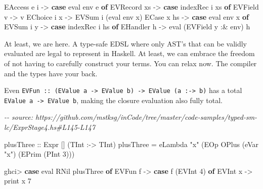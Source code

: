 \documentclass[]{article}
\newenvironment{Shaded}{}{}
\newcommand{\CommentTok}[1]{\textcolor[rgb]{0.38,0.63,0.69}{\textit{#1}}}
\newcommand{\DataTypeTok}[1]{\textcolor[rgb]{0.56,0.13,0.00}{#1}}
\newcommand{\DecValTok}[1]{\textcolor[rgb]{0.25,0.63,0.44}{#1}}
\newcommand{\FunctionTok}[1]{\textcolor[rgb]{0.02,0.16,0.49}{#1}}
\newcommand{\KeywordTok}[1]{\textcolor[rgb]{0.00,0.44,0.13}{\textbf{#1}}}
\newcommand{\NormalTok}[1]{#1}
\newcommand{\OperatorTok}[1]{\textcolor[rgb]{0.40,0.40,0.40}{#1}}
\newcommand{\OtherTok}[1]{\textcolor[rgb]{0.00,0.44,0.13}{#1}}
\newcommand{\StringTok}[1]{\textcolor[rgb]{0.25,0.44,0.63}{#1}}
\begin{document}
\begin{Shaded}
\begin{Highlighting}[]
  \DataTypeTok{EAccess}\NormalTok{ e i }\OtherTok{{-}\textgreater{}} \KeywordTok{case}\NormalTok{ eval env e }\KeywordTok{of}
    \DataTypeTok{EVRecord}\NormalTok{ xs }\OtherTok{{-}\textgreater{}} \KeywordTok{case}\NormalTok{ indexRec i xs }\KeywordTok{of}
      \DataTypeTok{EVField}\NormalTok{ v }\OtherTok{{-}\textgreater{}}\NormalTok{ v}
  \DataTypeTok{EChoice}\NormalTok{ i x }\OtherTok{{-}\textgreater{}} \DataTypeTok{EVSum}\NormalTok{ i (eval env x)}
  \DataTypeTok{ECase}\NormalTok{ x hs }\OtherTok{{-}\textgreater{}} \KeywordTok{case}\NormalTok{ eval env x }\KeywordTok{of}
    \DataTypeTok{EVSum}\NormalTok{ i y }\OtherTok{{-}\textgreater{}} \KeywordTok{case}\NormalTok{ indexRec i hs }\KeywordTok{of}
      \DataTypeTok{EHandler}\NormalTok{ h }\OtherTok{{-}\textgreater{}}\NormalTok{ eval (}\DataTypeTok{EVField}\NormalTok{ y }\OperatorTok{:\&}\NormalTok{ env) h}
\end{Highlighting}
\end{Shaded}

At least, we are here. A type-safe EDSL where only AST's that can be validly
evaluated are legal to represent in Haskell. At least, we can embrace the
freedom of not having to carefully construct your terms. You can relax now. The
compiler and the types have your back.

Even
\texttt{EVFun\ ::\ (EValue\ a\ -\textgreater{}\ EValue\ b)\ -\textgreater{}\ EValue\ (a\ :-\textgreater{}\ b)}
has a total \texttt{EValue\ a\ -\textgreater{}\ EValue\ b}, making the closure
evaluation also fully total.

\begin{Shaded}
\begin{Highlighting}[]
\CommentTok{{-}{-} source: https://github.com/mstksg/inCode/tree/master/code{-}samples/typed{-}sm{-}lc/ExprStage4.hs\#L145{-}L147}

\OtherTok{plusThree ::} \DataTypeTok{Expr}\NormalTok{ \textquotesingle{}[] (}\DataTypeTok{TInt} \OperatorTok{:{-}\textgreater{}} \DataTypeTok{TInt}\NormalTok{)}
\NormalTok{plusThree }\OtherTok{=}
\NormalTok{  eLambda }\StringTok{"x"}\NormalTok{ (}\DataTypeTok{EOp} \DataTypeTok{OPlus}\NormalTok{ (eVar }\StringTok{"x"}\NormalTok{) (}\DataTypeTok{EPrim}\NormalTok{ (}\DataTypeTok{PInt} \DecValTok{3}\NormalTok{)))}
\end{Highlighting}
\end{Shaded}

\begin{Shaded}
\begin{Highlighting}[]
\NormalTok{ghci}\OperatorTok{\textgreater{}} \KeywordTok{case}\NormalTok{ eval }\DataTypeTok{RNil}\NormalTok{ plusThree }\KeywordTok{of}
    \DataTypeTok{EVFun}\NormalTok{ f }\OtherTok{{-}\textgreater{}} \KeywordTok{case}\NormalTok{ f (}\DataTypeTok{EVInt} \DecValTok{4}\NormalTok{) }\KeywordTok{of}
      \DataTypeTok{EVInt}\NormalTok{ x }\OtherTok{{-}\textgreater{}} \FunctionTok{print}\NormalTok{ x}
\DecValTok{7}
\end{Highlighting}
\end{Shaded}
\end{document}
